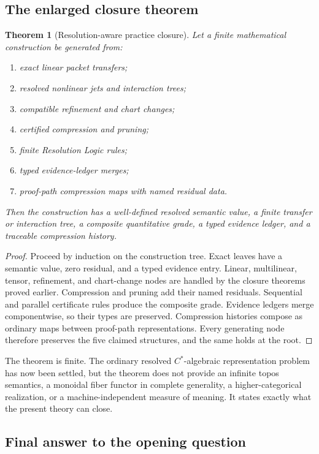 \documentclass[11pt]{article}
\newtheorem{theorem}{Theorem}[section]
\theoremstyle{definition}
\theoremstyle{remark}
\begin{document}
\subsection{The enlarged closure theorem}

\begin{theorem}[Resolution-aware practice closure]
Let a finite mathematical construction be generated from:
\begin{enumerate}[label=\textup{(\roman*)}]
\item exact linear packet transfers;
\item resolved nonlinear jets and interaction trees;
\item compatible refinement and chart changes;
\item certified compression and pruning;
\item finite Resolution Logic rules;
\item typed evidence-ledger merges;
\item proof-path compression maps with named residual data.
\end{enumerate}
Then the construction has a well-defined resolved semantic value, a finite transfer or interaction tree, a composite quantitative grade, a typed evidence ledger, and a traceable compression history.
\end{theorem}

\begin{proof}
Proceed by induction on the construction tree.  Exact leaves have a semantic value, zero residual, and a typed evidence entry.  Linear, multilinear, tensor, refinement, and chart-change nodes are handled by the closure theorems proved earlier.  Compression and pruning add their named residuals.  Sequential and parallel certificate rules produce the composite grade.  Evidence ledgers merge componentwise, so their types are preserved.  Compression histories compose as ordinary maps between proof-path representations.  Every generating node therefore preserves the five claimed structures, and the same holds at the root.
\end{proof}

The theorem is finite.  The ordinary resolved $C^*$-algebraic representation problem has now been settled, but the theorem does not provide an infinite topos semantics, a monoidal fiber functor in complete generality, a higher-categorical realization, or a machine-independent measure of meaning.  It states exactly what the present theory can close.

\subsection{Final answer to the opening question}
\end{document}
